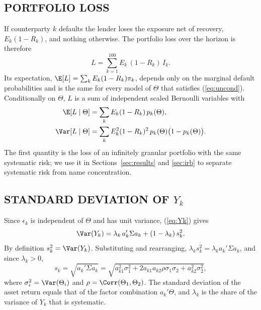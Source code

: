 \subsection{PORTFOLIO LOSS}
\label{subsec:loss}
If counterparty $k$ defaults the lender loses the exposure net of recovery, $E_k(1-R_k)$, and nothing otherwise. The portfolio loss over the horizon is therefore
\begin{equation}
\label{eq:loss}
L=\sum_{k=1}^{100}E_k\,(1-R_k)\,I_k .
\end{equation}
Its expectation, $\E[L]=\sum_k E_k(1-R_k)\pi_k$, depends only on the marginal default probabilities and is the same for every model of $\Theta$ that satisfies (\ref{eq:uncond}). Conditionally on $\Theta$, $L$ is a sum of independent scaled Bernoulli variables with
\begin{equation}
\label{eq:condloss}
\begin{aligned}
\E[L\mid\Theta]&=\sum_k E_k(1-R_k)\,p_k(\Theta),\\
\Var[L\mid\Theta]&=\sum_k E_k^2(1-R_k)^2\,p_k(\Theta)\big(1-p_k(\Theta)\big).
\end{aligned}
\end{equation}
The first quantity is the loss of an infinitely granular portfolio with the same systematic risk; we use it in Sections~\ref{sec:results} and \ref{sec:irb} to separate systematic risk from name concentration.

\subsection{STANDARD DEVIATION OF $Y_k$}
\label{subsec:sk}
Since $\epsilon_k$ is independent of $\Theta$ and has unit variance, (\ref{eq:Yk}) gives
\[
\Var(Y_k)=\lambda_k\,a_k'\Sigma a_k+(1-\lambda_k)\,s_k^2 .
\]
By definition $s_k^2=\Var(Y_k)$. Substituting and rearranging, $\lambda_k s_k^2=\lambda_k a_k'\Sigma a_k$, and since $\lambda_k>0$,
\begin{equation}
\label{eq:sk}
s_k=\sqrt{a_k'\Sigma a_k}=\sqrt{a_{k1}^2\sigma_1^2+2a_{k1}a_{k2}\rho\sigma_1\sigma_2+a_{k2}^2\sigma_2^2},
\end{equation}
where $\sigma_i^2=\Var(\Theta_i)$ and $\rho=\Corr(\Theta_1,\Theta_2)$. The standard deviation of the asset return equals that of the factor combination $a_k'\Theta$, and $\lambda_k$ is the share of the variance of $Y_k$ that is systematic.

